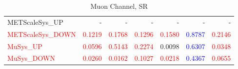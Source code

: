 \documentclass[11pt,oneside,a4paper]{article}
\begin{document}
\begin{table}
\begin{tabular}{lrrrrrr}
METScaleSys\_UP & - & - & - & - & - & - \\
\textcolor{red}{METScaleSys\_DOWN} & \textcolor{red}{0.1219} & \textcolor{red}{0.1768} & \textcolor{red}{0.1296} & \textcolor{red}{0.1580} & \textcolor{blue}{0.8787} & \textcolor{red}{0.2146} \\
\textcolor{red}{MuSys\_UP} & \textcolor{red}{0.0596} & \textcolor{red}{0.5143} & \textcolor{red}{0.2274} & 0.0098 & \textcolor{blue}{0.6307} & \textcolor{red}{0.0348} \\
\textcolor{red}{MuSys\_DOWN} & \textcolor{red}{0.0260} & \textcolor{red}{0.0162} & \textcolor{red}{0.1027} & \textcolor{red}{0.0218} & \textcolor{blue}{0.4367} & \textcolor{red}{0.0655} \\

\end{tabular}
\caption{Muon Channel, SR}
\end{table}
\end{document}
